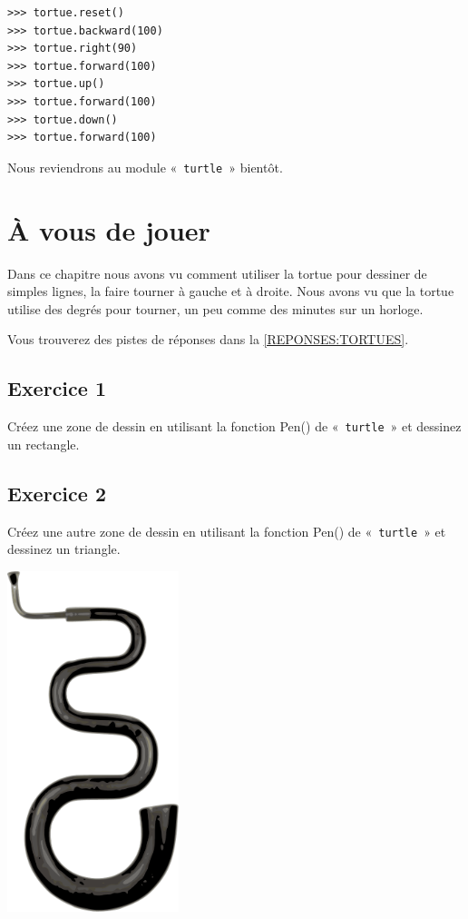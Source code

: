 \begin{Verbatim}[frame=single,rulecolor=\color{mbleu}, label=à taper]
>>> tortue.reset()
>>> tortue.backward(100)
>>> tortue.right(90)
>>> tortue.forward(100)
>>> tortue.up()
>>> tortue.forward(100)
>>> tortue.down()
>>> tortue.forward(100)
\end{Verbatim}

Nous reviendrons au module «~\texttt{turtle}~»  bientôt.

\section{À vous de jouer}\label{PRATIQUE:TORTUES}
Dans ce chapitre nous avons vu comment utiliser la tortue pour dessiner de simples lignes, la faire tourner à gauche et à droite. Nous avons vu que la tortue utilise des degrés pour tourner, un peu comme des minutes sur un horloge.

Vous trouverez des pistes de réponses dans la \autoref{REPONSES:TORTUES}.
\subsection*{Exercice 1}
Créez une zone de dessin en utilisant la fonction Pen() de «~\texttt{turtle}~» et dessinez un rectangle.
\subsection*{Exercice 2}
Créez une autre zone de dessin en utilisant la fonction Pen() de «~\texttt{turtle}~» et dessinez un triangle.
 \vfill
\begin{center}
 \includegraphics[width=5cm]{images/sem.pdf}
\end{center}
 \vfill

\clearemptydoublepage
